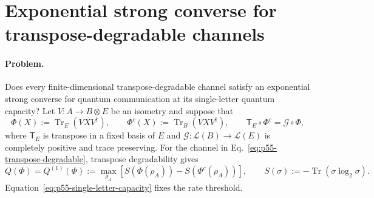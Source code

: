 \section{Exponential strong converse for transpose-degradable channels}
\label{sec:problem-55}

\paragraph{Problem.}
Does every finite-dimensional transpose-degradable channel satisfy an
exponential strong converse for quantum communication at its single-letter
quantum capacity?  Let $V:A\to B\otimes E$ be an isometry and suppose that
\begin{equation}
  \Phi(X):=\operatorname{Tr}_E(VXV^\dagger),
  \qquad
  \Phi^c(X):=\operatorname{Tr}_B(VXV^\dagger),
  \qquad
  \mathsf T_E\circ\Phi^c=\mathcal G\circ\Phi,
  \label{eq:p55-transpose-degradable}
\end{equation}
where $\mathsf T_E$ is transpose in a fixed basis of $E$ and
$\mathcal G:\mathcal L(B)\to\mathcal L(E)$ is completely positive and
trace preserving.  For the channel in
Eq.~\eqref{eq:p55-transpose-degradable}, transpose degradability gives
\begin{equation}
  Q(\Phi)=Q^{(1)}(\Phi)
  :=\max_{\rho_A}
     \left[S(\Phi(\rho_A))-S(\Phi^c(\rho_A))\right],
  \qquad
  S(\sigma):=-\operatorname{Tr}(\sigma\log_2\sigma).
  \label{eq:p55-single-letter-capacity}
\end{equation}
Equation~\eqref{eq:p55-single-letter-capacity} fixes the rate threshold.

